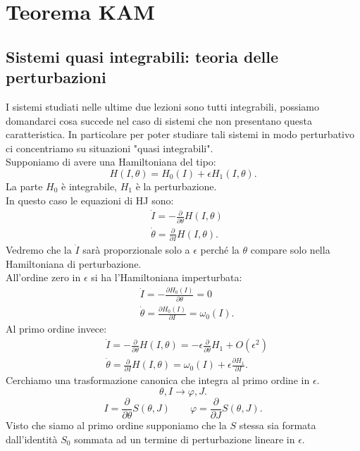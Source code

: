 \section{Teorema KAM}%
\label{sub:Lezione 17}
\mylocaltoc
\subsection{Sistemi quasi integrabili: teoria delle perturbazioni}%
\label{sub:Sistemi quasi integrabili: teoria delle perturbazioni}
I sistemi studiati nelle ultime due lezioni sono tutti integrabili, possiamo domandarci cosa succede nel caso di sistemi che non presentano questa caratteristica. In particolare per poter studiare tali sistemi in modo perturbativo ci concentriamo su situazioni "quasi integrabili".\\
Supponiamo di avere una Hamiltoniana del tipo:
\[
    H(I, \theta) = H_0(I) + \epsilon H_1(I, \theta  ) 
.\] 
La parte $H_0$ è integrabile, $H_1$ è la perturbazione.\\
In questo caso le equazioni di HJ sono:
\[\begin{aligned}
     & \dot{I} = - \frac{\partial }{\partial \theta  } H(I,\theta  ) \\
     & \dot{\theta} = \frac{\partial}{\partial I} H(I, \theta  ) 
.\end{aligned}\]
Vedremo che la $\dot{I}$  sarà proporzionale solo a $\epsilon$  perché la $\theta  $  compare solo nella Hamiltoniana di perturbazione.\\
All'ordine zero in $\epsilon$ si ha l'Hamiltoniana imperturbata:
\[\begin{aligned}
    & \dot{I} = - \frac{\partial H_0(I)}{\partial \theta  } = 0\\
    & \dot{\theta  }=\frac{\partial H_0(I) }{\partial I} = \omega_0(I) 
.\end{aligned}\]
Al primo ordine invece:
\[\begin{aligned}
    & \dot{I} = - \frac{\partial }{\partial \theta} H(I, \theta)= -\epsilon\frac{\partial }{\partial \theta  } H_1 + O(\epsilon^2) \\ 
    & \dot{\theta  }=\frac{\partial  }{\partial I} H(I, \theta) = \omega_0(I) + \epsilon  \frac{\partial H_1}{\partial I} 
.\end{aligned}\]
Cerchiamo una trasformazione canonica che integra al primo ordine in $\epsilon$.
\[
    \theta, I \to \varphi, J
.\] 
\[
    I = \frac{\partial }{\partial \theta  } S(\theta, J)  \qquad \varphi = \frac{\partial }{\partial J} S(\theta, J) 
.\] 
Visto che siamo al primo ordine supponiamo che la $S$  stessa sia formata dall'identità $S_0$  sommata ad un termine di perturbazione lineare in $\epsilon$.\\
